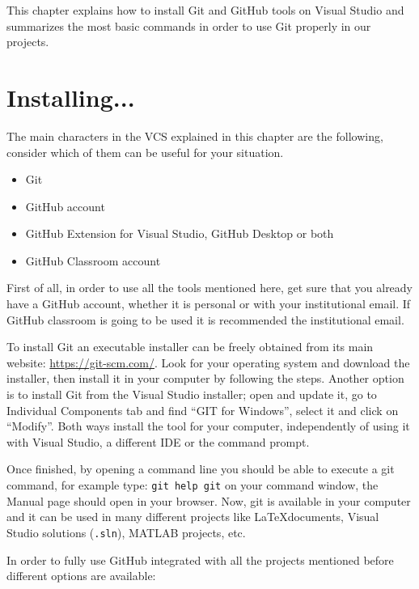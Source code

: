 This chapter explains how to install Git and GitHub tools on Visual Studio and summarizes the most basic commands in order to use Git properly in our projects. 




    \section{Installing...}
   
The main characters in the VCS explained in this chapter are the following, consider which of them can be useful for your situation.  

\begin{itemize}
    \item Git 
    \item GitHub account
    \item GitHub Extension for Visual Studio, GitHub Desktop or both
    \item GitHub Classroom account
\end{itemize}
   
First of all, in order to use all the tools mentioned here, get sure that you already have a GitHub account, whether it is personal or with your institutional email. If GitHub classroom is going to be used it is recommended the institutional email. 
    
To install Git an executable installer can be freely obtained from its main website: \underline{https://git-scm.com/}. Look for your operating system and download the installer, then install it in your computer by following the steps. Another option is to install Git from the Visual Studio installer; open and update it, go to Individual Components tab and find ``GIT for Windows'', select it and click on ``Modify''. Both ways install the tool for your computer, independently of using it with Visual Studio, a different IDE or the command prompt.

Once finished, by opening a command line you should be able to execute a git command, for example type: \texttt{git help git} on your command window, the Manual page should open in your browser. Now, git is available in your computer and it can be used in many different projects like \LaTeX documents, Visual Studio solutions (\texttt{.sln}), MATLAB projects, etc. 

In order to fully use GitHub integrated with all the projects mentioned before different options are available:

